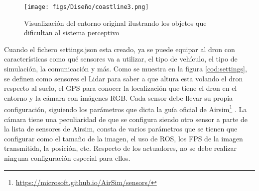 \begin{figure} [H]
  \begin{center}
    \texttt{[image: figs/Diseño/coastline3.png]}
  \end{center}
  \caption{Visualización del entorno original ilustrando los objetos que dificultan al sistema perceptivo}
  \label{fig:CoastlineModificado}
  \vspace{-1.5em}
\end{figure}
Cuando el fichero settings.json esta creado, ya se puede equipar al dron con características como qué sensores va a utilizar, 
el tipo de vehículo, el tipo de simulación, la comunicación y más. Como se muestra en la figura \ref{cod:settings}, se definen como sensores el Lidar para saber a que altura
esta volando el dron respecto al suelo, el GPS para conocer la localización que tiene el dron en el entorno y la cámara con imágenes
RGB. Cada sensor debe llevar su propia configuración, siguiendo los parámetros que dicta la guía oficial de Airsim\footnote{\url{https://microsoft.github.io/AirSim/sensors/}}
. La cámara tiene una peculiaridad de que se configura siendo otro sensor a parte de la lista de sensores de Airsim, consta de varios parámetros que se tienen que configurar como 
el tamaño de la imagen, el uso de ROS, los FPS de la imagen transmitida, la posición, etc. 
Respecto de los actuadores, no se debe realizar ninguna configuración especial para ellos.

